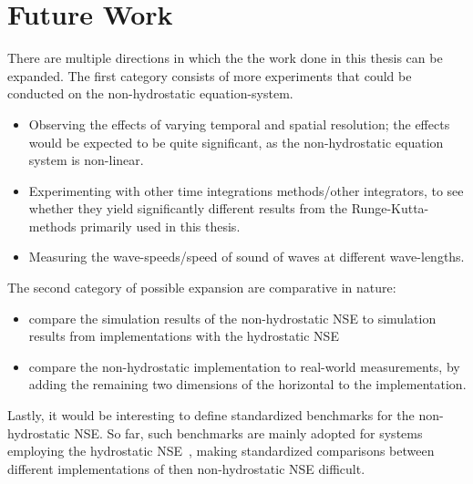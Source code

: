 \section{Future Work}
There are multiple directions in which the the work done in this thesis can be expanded.
The first category consists of more experiments that could be conducted on the non-hydrostatic equation-system.
\begin{itemize}
\item Observing the effects of varying temporal and spatial resolution; the effects would be expected to be quite significant, as the non-hydrostatic equation system is non-linear.
\item Experimenting with other time integrations methods/other integrators, to see whether they yield significantly different results from the Runge-Kutta-methods primarily used in this thesis.
\item Measuring the wave-speeds/speed of sound of waves at different wave-lengths. 
\end{itemize}
The second category of possible expansion are comparative in nature:
\begin{itemize}
\item compare the simulation results of the non-hydrostatic NSE to simulation results from implementations with the hydrostatic NSE
\item compare the non-hydrostatic implementation to real-world measurements, by adding the remaining two dimensions of the horizontal to the implementation.
\end{itemize}
Lastly, it would be interesting to define standardized benchmarks for the non-hydrostatic NSE.
So far, such benchmarks are mainly adopted for systems employing the hydrostatic NSE~\cite{williamson1992standard}, making standardized comparisons between different implementations of then non-hydrostatic NSE difficult.